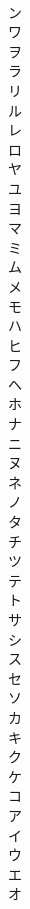 \documentclass[8pt]{extreport}
\begin{document}
\begin{CJK}{UTF8}{min}
\\	ン	
\\	ワ	
\\	ヲ	
\\	ラ	
\\	リ	
\\	ル	
\\	レ	
\\	ロ	
\\	ヤ	
\\	ユ	
\\	ヨ	
\\	マ	
\\	ミ	
\\	ム	
\\	メ	
\\	モ	
\\	ハ	
\\	ヒ	
\\	フ	
\\	ヘ	
\\	ホ	
\\	ナ	
\\	ニ	
\\	ヌ	
\\	ネ	
\\	ノ	
\\	タ	
\\	チ	
\\	ツ	
\\	テ	
\\	ト	
\\	サ	
\\	シ	
\\	ス	
\\	セ	
\\	ソ	
\\	カ	
\\	キ	
\\	ク	
\\	ケ	
\\	コ	
\\	ア	
\\	イ	
\\	ウ
\\	エ	
\\	オ	
\end{CJK}
\end{document}
